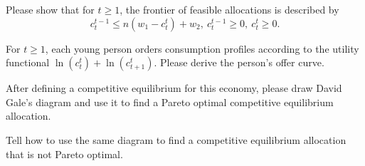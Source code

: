 \medskip
{} Please show that for $t \geq 1$, the frontier of feasible allocations is described by
$$ c_t^{t-1} \le n(w_1- c_t^t) + w_2, \ c_t^{t-1} \geq 0, \ c_t^t \geq 0 .$$

\medskip
{}  For $t \geq 1$, each young person  orders consumption profiles according to the
utility functional
$ \ln (c_t^t) + \ln (c^t_{t+1}) .$
Please derive the person's offer curve.

\medskip
{} After defining a competitive equilibrium for this economy, please draw David Gale's diagram and use it to find a Pareto optimal competitive equilibrium  allocation.

\medskip
{} Tell how to use the same diagram to find a competitive equilibrium allocation that is not Pareto optimal.


